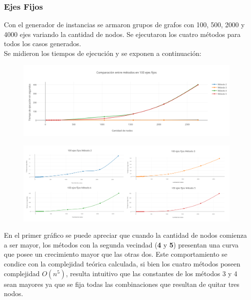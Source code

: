 \subsubsection*{Ejes Fijos}

Con el generador de instancias se armaron grupos de grafos con 100, 500, 2000 y 4000 ejes variando la cantidad de nodos. Se ejecutaron los cuatro m\'etodos para todos los casos generados.\\

Se midieron los tiempos de ejecuci\'on y se exponen a continuaci\'on:

  \begin{figure}[h!]
   \begin{center}
 	\includegraphics[scale=0.55]{imagenes/local/tiempos/100ejes.png}
   \end{center}
 \end{figure}
 
  \begin{figure}[h!]
   \begin{center}
 	\includegraphics[scale=0.08]{imagenes/local/tiempos/100ejes2.png}
   \end{center}
 \end{figure}

  \newpage  
 
En el primer gr\'afico se puede apreciar que cuando la cantidad de nodos comienza a ser mayor, los m\'etodos con la segunda vecindad (\textbf{4} y \textbf{5}) presentan una curva que posee un crecimiento mayor que las otras dos. Este comportamiento se condice con la complejidad te\'orica calculada, si bien los cuatro métodos poseen complejidad $O(n^5)$, resulta intuitivo que las constantes de los m\'etodos 3 y 4 sean mayores ya que se fija todas las combinaciones que resultan de quitar tres nodos.\\

